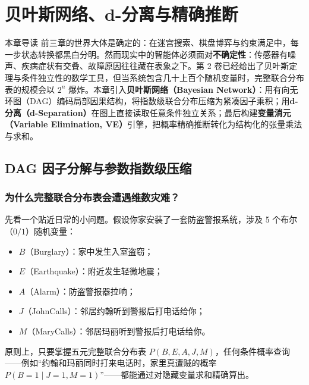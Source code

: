 \chapter[贝叶斯网络、d-分离与精确推断]{贝叶斯网络、d-分离与精确推断}\label{ch:bayesnet}

\begin{chapIntro}{本章导读}
前三章的世界大体是确定的：在迷宫搜索、棋盘博弈与约束满足中，每一步状态转换都黑白分明。然而现实中的智能体必须面对\textbf{不确定性}：传感器有噪声、疾病症状有交叠、故障原因往往藏在表象之下。第 2 卷已经给出了贝叶斯定理与条件独立性的数学工具，但当系统包含几十上百个随机变量时，完整联合分布表的规模会以 $2^n$ 爆炸。本章引入\textbf{贝叶斯网络（Bayesian Network）}：用有向无环图（DAG）编码局部因果结构，将指数级联合分布压缩为紧凑因子乘积；用\textbf{d-分离（d-Separation）}在图上直接读取任意条件独立关系；最后构建\textbf{变量消元（Variable Elimination, VE）}引擎，把概率精确推断转化为结构化的张量乘法与求和。
\end{chapIntro}

\section{DAG 因子分解与参数指数级压缩}\label{sec:bn-dag}

\subsection{为什么完整联合分布表会遭遇维数灾难？}

先看一个贴近日常的小问题。假设你家安装了一套防盗警报系统，涉及 5 个布尔（$0/1$）随机变量：
\begin{itemize}
  \item $B$（Burglary）：家中发生入室盗窃；
  \item $E$（Earthquake）：附近发生轻微地震；
  \item $A$（Alarm）：防盗警报器拉响；
  \item $J$（JohnCalls）：邻居约翰听到警报后打电话给你；
  \item $M$（MaryCalls）：邻居玛丽听到警报后打电话给你。
\end{itemize}
原则上，只要掌握五元完整联合分布表 $P(B, E, A, J, M)$，任何条件概率查询——例如“约翰和玛丽同时打来电话时，家里真遭贼的概率 $P(B=1 \mid J=1, M=1)$”——都能通过对隐藏变量求和精确算出。

